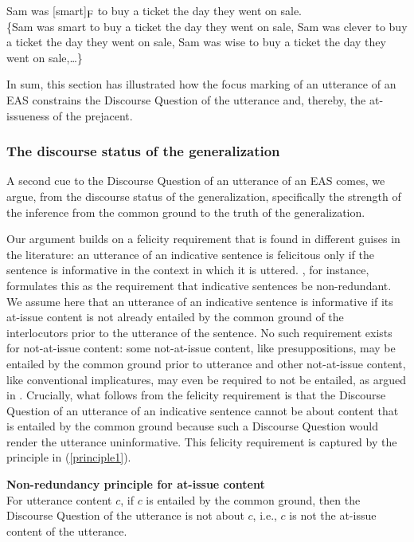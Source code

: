 \documentclass[11pt,fleqn]{article}
\newcommand{\foc}{$_{\mbox{\small F}}$}
\newcommand{\6}{\mbox{$[\hspace*{-.6mm}[$}}
\newcommand{\9}{\mbox{$]\hspace*{-.6mm}]$}}
\begin{document}
\begin{exe}
\ex\label{aic} Sam was [smart]\foc{} to buy a ticket the day they went on sale.
\\ \{Sam was smart to buy a ticket the day they went on sale, Sam was clever to buy a ticket the day they went on sale, Sam was wise to buy a ticket the day they went on sale,\ldots\}
\end{exe}

In sum, this section has illustrated how the focus marking of an utterance of an EAS constrains the Discourse Question of the utterance and, thereby, the at-issueness of the prejacent. 


\subsubsection{The discourse status of the generalization}\label{s332}

A second cue to the Discourse Question of an utterance of an EAS comes, we argue, from the discourse status of the generalization, specifically the strength of the inference from the common ground to the truth of the generalization.

 Our argument builds on a felicity requirement that is found in different guises in the literature: an utterance of an indicative sentence is felicitous only if the sentence is informative in the context in which it is uttered. \citet[144]{groenendijk1999}, for instance, formulates this as the requirement that indicative sentences be non-redundant. We assume here that an utterance of an indicative sentence is informative if its at-issue content is not already entailed by the common ground of the interlocutors prior to the utterance of the sentence. No such requirement exists for not-at-issue content: some not-at-issue content, like presuppositions, may be entailed by the common ground prior to utterance and other not-at-issue content, like conventional implicatures, may even be required to not be entailed, as argued in \citealt{potts05}. 
 Crucially, what follows from the felicity requirement is that the Discourse Question of an utterance of an indicative sentence cannot be about content that is entailed by the common ground because such a Discourse Question would render the utterance uninformative. This felicity requirement is captured by the principle in (\ref{principle1}).
 
\begin{exe}
\ex\label{principle1} {\bf Non-redundancy principle for at-issue content} \\ For utterance content $c$, if $c$ is entailed by the common ground, then the Discourse Question of the utterance is not about $c$, i.e., $c$ is not the at-issue content of the utterance. 
\end{exe}
\end{document}
